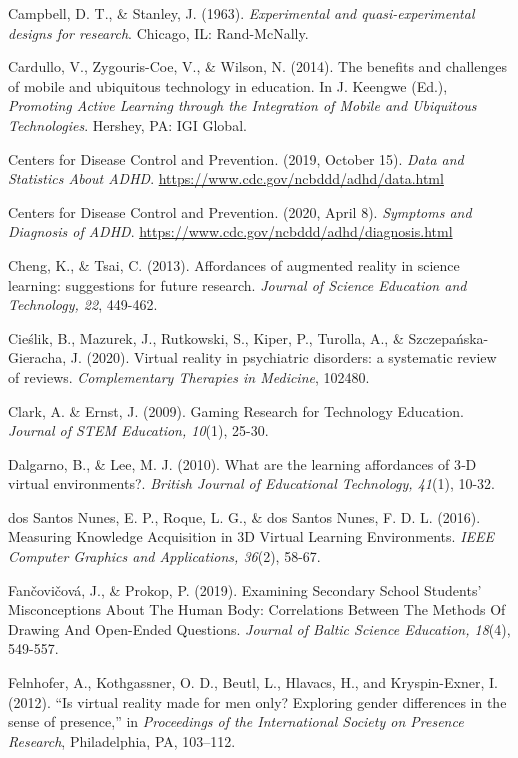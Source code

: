 \documentclass[11.5pt]{sig-alternate} %
\begin{document}
Campbell, D. T., \& Stanley, J. (1963). \textit{Experimental and quasi-experimental designs for research}. Chicago, IL: Rand-McNally.

Cardullo, V., Zygouris-Coe, V., \& Wilson, N. (2014). The benefits and challenges of mobile and ubiquitous technology in education. In J. Keengwe (Ed.), \textit{Promoting Active Learning through the Integration of Mobile and Ubiquitous Technologies}. Hershey, PA: IGI Global.

Centers for Disease Control and Prevention. (2019, October 15). \textit{Data and Statistics About ADHD}. \url{https://www.cdc.gov/ncbddd/adhd/data.html}

Centers for Disease Control and Prevention. (2020, April 8). \textit{Symptoms and Diagnosis of ADHD}. \url{https://www.cdc.gov/ncbddd/adhd/diagnosis.html}
 
Cheng, K., \& Tsai, C. (2013). Affordances of augmented reality in science learning: suggestions for future research. \textit{Journal of Science Education and Technology, 22}, 449-462.

Cieślik, B., Mazurek, J., Rutkowski, S., Kiper, P., Turolla, A., \& Szczepańska-Gieracha, J. (2020). Virtual reality in psychiatric disorders: a systematic review of reviews. \textit{Complementary Therapies in Medicine}, 102480.

Clark, A. \& Ernst, J. (2009). Gaming Research for Technology Education. \textit{Journal of STEM Education, 10}(1), 25-30.

Dalgarno, B., \& Lee, M. J. (2010). What are the learning affordances of 3‐D virtual environments?. \textit{British Journal of Educational Technology, 41}(1), 10-32.

dos Santos Nunes, E. P., Roque, L. G., \& dos Santos Nunes, F. D. L. (2016). Measuring Knowledge Acquisition in 3D Virtual Learning Environments. \textit{IEEE Computer Graphics and Applications, 36}(2), 58-67. 

Fančovičová, J., \& Prokop, P. (2019). Examining Secondary School Students’ Misconceptions About The Human Body: Correlations Between The Methods Of Drawing And Open-Ended Questions. \textit{Journal of Baltic Science Education, 18}(4), 549-557.

Felnhofer, A., Kothgassner, O. D., Beutl, L., Hlavacs, H., and Kryspin-Exner, I. (2012). “Is virtual reality made for men only? Exploring gender differences in the sense of presence,” in \textit{Proceedings of the International Society on Presence Research}, Philadelphia, PA, 103–112. 
\end{document}
